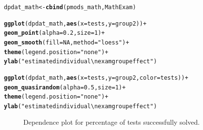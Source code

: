 \documentclass{josr}\usepackage[]{graphicx}\usepackage[]{color}
\makeatletter
\newcommand{\hlnum}[1]{\textcolor[rgb]{0.686,0.059,0.569}{#1}}%
\newcommand{\hlstr}[1]{\textcolor[rgb]{0.192,0.494,0.8}{#1}}%
\newcommand{\hlopt}[1]{\textcolor[rgb]{0,0,0}{#1}}%
\newcommand{\hlstd}[1]{\textcolor[rgb]{0.345,0.345,0.345}{#1}}%
\newcommand{\hlkwb}[1]{\textcolor[rgb]{0.69,0.353,0.396}{#1}}%
\newcommand{\hlkwc}[1]{\textcolor[rgb]{0.333,0.667,0.333}{#1}}%
\newcommand{\hlkwd}[1]{\textcolor[rgb]{0.737,0.353,0.396}{\textbf{#1}}}%
\newenvironment{kframe}{%
 \def\at@end@of@kframe{}%
 \ifinner\ifhmode%
  \def\at@end@of@kframe{\end{minipage}}%
  \begin{minipage}{\columnwidth}%
 \fi\fi%
 \def\FrameCommand##1{\hskip\@totalleftmargin \hskip-\fboxsep
 \colorbox{shadecolor}{##1}\hskip-\fboxsep
     \hskip-\linewidth \hskip-\@totalleftmargin \hskip\columnwidth}%
 \MakeFramed {\advance\hsize-\width
   \@totalleftmargin\z@ \linewidth\hsize
   \@setminipage}}%
 {\par\unskip\endMakeFramed%
 \at@end@of@kframe}
\newenvironment{knitrout}{}{} %
\makeatother
\begin{document}
\begin{knitrout}
\color{fgcolor}\begin{kframe}
\begin{alltt}
\hlstd{dpdat_math} \hlkwb{<-} \hlkwd{cbind}\hlstd{(pmods_math, MathExam)}

\hlkwd{ggplot}\hlstd{(dpdat_math,} \hlkwd{aes}\hlstd{(}\hlkwc{x} \hlstd{= tests,} \hlkwc{y} \hlstd{= group2))} \hlopt{+}
  \hlkwd{geom_point}\hlstd{(}\hlkwc{alpha} \hlstd{=} \hlnum{0.2}\hlstd{,} \hlkwc{size} \hlstd{=} \hlnum{1}\hlstd{)} \hlopt{+}
  \hlkwd{geom_smooth}\hlstd{(}\hlkwc{fill} \hlstd{=} \hlnum{NA}\hlstd{,} \hlkwc{method} \hlstd{=} \hlstr{"loess"}\hlstd{)} \hlopt{+}
  \hlkwd{theme}\hlstd{(}\hlkwc{legend.position} \hlstd{=} \hlstr{"none"}\hlstd{)} \hlopt{+}
  \hlkwd{ylab}\hlstd{(}\hlstr{"estimated individual\textbackslash{}nexam group effect"}\hlstd{)}

\hlkwd{ggplot}\hlstd{(dpdat_math,} \hlkwd{aes}\hlstd{(}\hlkwc{x} \hlstd{= tests,} \hlkwc{y} \hlstd{= group2,} \hlkwc{color} \hlstd{= tests))} \hlopt{+}
  \hlkwd{geom_quasirandom}\hlstd{(}\hlkwc{alpha} \hlstd{=} \hlnum{0.5}\hlstd{,} \hlkwc{size} \hlstd{=} \hlnum{1}\hlstd{)} \hlopt{+}
  \hlkwd{theme}\hlstd{(}\hlkwc{legend.position} \hlstd{=} \hlstr{"none"}\hlstd{)} \hlopt{+}
  \hlkwd{ylab}\hlstd{(}\hlstr{"estimated individual\textbackslash{}nexam group effect"}\hlstd{)}
\end{alltt}
\end{kframe}\begin{figure}

{\centering {}

}

\caption[Dependence plot for percentage of tests successfully solved]{Dependence plot for percentage of tests successfully solved.}\label{fig:math_dp1}
\end{figure}


\end{knitrout}
\end{document}
